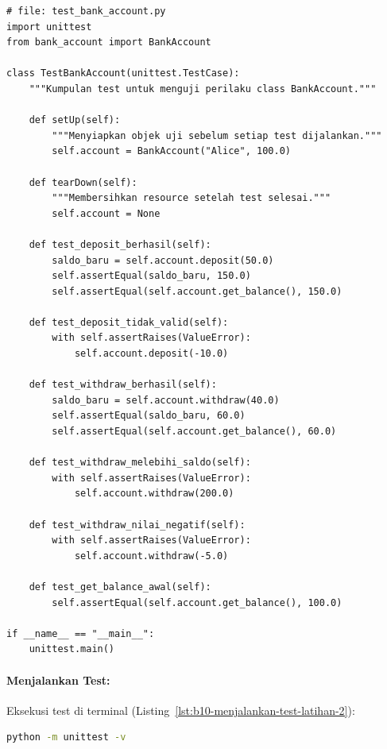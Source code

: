 \begin{lstlisting}[style=PythonStyle, caption={Pengujian method dengan state menggunakan unittest}, label={lst:test-bankaccount}]
# file: test_bank_account.py
import unittest
from bank_account import BankAccount

class TestBankAccount(unittest.TestCase):
    """Kumpulan test untuk menguji perilaku class BankAccount."""

    def setUp(self):
        """Menyiapkan objek uji sebelum setiap test dijalankan."""
        self.account = BankAccount("Alice", 100.0)

    def tearDown(self):
        """Membersihkan resource setelah test selesai."""
        self.account = None

    def test_deposit_berhasil(self):
        saldo_baru = self.account.deposit(50.0)
        self.assertEqual(saldo_baru, 150.0)
        self.assertEqual(self.account.get_balance(), 150.0)

    def test_deposit_tidak_valid(self):
        with self.assertRaises(ValueError):
            self.account.deposit(-10.0)

    def test_withdraw_berhasil(self):
        saldo_baru = self.account.withdraw(40.0)
        self.assertEqual(saldo_baru, 60.0)
        self.assertEqual(self.account.get_balance(), 60.0)

    def test_withdraw_melebihi_saldo(self):
        with self.assertRaises(ValueError):
            self.account.withdraw(200.0)

    def test_withdraw_nilai_negatif(self):
        with self.assertRaises(ValueError):
            self.account.withdraw(-5.0)

    def test_get_balance_awal(self):
        self.assertEqual(self.account.get_balance(), 100.0)

if __name__ == "__main__":
    unittest.main()
\end{lstlisting}

\paragraph{Menjalankan Test:}
Eksekusi test di terminal (Listing~\ref{lst:b10-menjalankan-test-latihan-2}):

\begin{lstlisting}[language=bash, caption={Menjalankan test pada Latihan 2}, label={lst:b10-menjalankan-test-latihan-2}]
python -m unittest -v
\end{lstlisting}

